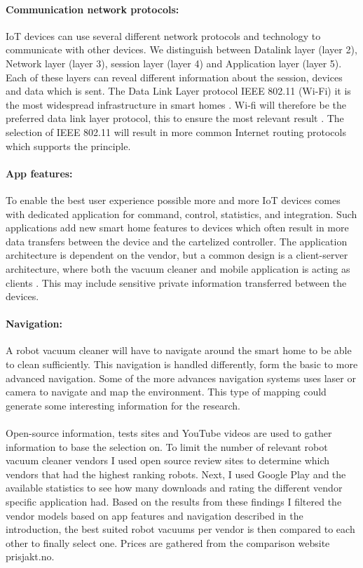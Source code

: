     \paragraph{Communication network protocols:} IoT devices can use several different network protocols and technology to communicate with other devices. We distinguish between Datalink layer (layer 2), Network layer (layer 3), session layer (layer 4) and Application layer (layer 5). Each of these layers can reveal different information about the session, devices and data which is sent. The Data Link Layer protocol IEEE 802.11 (Wi-Fi) it is the most widespread infrastructure in smart homes \cite{robotsel1}. Wi-fi will therefore be the preferred data link layer protocol, this to ensure the most relevant result \cite{robotsel2}\cite{robotsel3}. The selection of IEEE 802.11 will result in more common Internet routing protocols which supports the principle.

    \paragraph{App features:} To enable the best user experience possible more and more IoT devices comes with dedicated application for command, control, statistics, and integration. Such applications add new smart home features to devices which often result in more data transfers between the device and the cartelized controller. The application architecture is dependent on the vendor, but a common design is a client-server architecture, where both the vacuum cleaner and mobile application is acting as clients \cite{robotsel4}. This may include sensitive private information transferred between the devices. \cite{robotsel7}

    \paragraph{Navigation:}A robot vacuum cleaner will have to navigate around the smart home to be able to clean sufficiently. This navigation is handled differently, form the basic to more advanced navigation. Some of the more advances navigation systems uses laser or camera to navigate and map the environment. \cite{robotsel5} \cite{robotsel6} This type of mapping could generate some interesting information for the research. 

\paragraph{}Open-source information, tests sites and YouTube videos are used to gather information to base the selection on. To limit the number of relevant robot vacuum cleaner vendors I used open source review sites to determine which vendors that had the highest ranking robots. Next, I used Google Play and the available statistics to see how many downloads and rating the different vendor specific application had. Based on the results from these findings I filtered the vendor models based on app features and navigation described in the introduction, the best suited robot vacuums per vendor is then compared to each other to finally select one. Prices are gathered from the comparison website prisjakt.no\cite{prisjakt.no}. 

